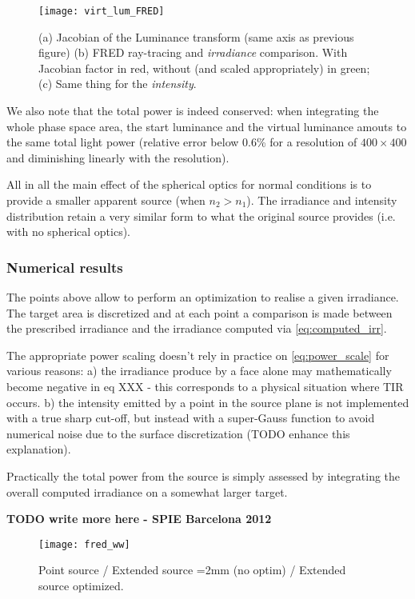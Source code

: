 \begin{figure}[!htbp]
\centering
\texttt{[image: virt\_lum\_FRED]} 
\caption{(a) Jacobian of the Luminance transform (same axis as previous figure)
(b) FRED ray-tracing and \textit{irradiance} comparison. 
 With Jacobian factor in red, without (and scaled appropriately) in green; 
 (c) Same thing for the \textit{intensity}. }
\label{fig:virt_lum_fred}
\end{figure}

We also note that the total power is indeed conserved: when integrating the whole phase
space area, the start luminance and the virtual luminance amouts to the same total
light power (relative error below 0.6\% for a resolution of $400\times 400$ and diminishing
linearly with the resolution).

All in all the main effect of the spherical optics for normal conditions is to provide
a smaller apparent source (when $n_2 > n_1$). The irradiance and 
intensity distribution retain a very similar form
to what the original source provides (i.e. with no spherical optics).

\subsubsection*{Numerical results}
The points above allow to perform an optimization to realise a given irradiance.
The target area is discretized and at each point a comparison is made between 
the prescribed irradiance and the irradiance computed via \eqref{eq:computed_irr}.

The appropriate power scaling doesn't rely in practice on \eqref{eq:power_scale}
for various reasons: a) the irradiance produce by a face alone may mathematically
become negative in eq XXX - this corresponds to a physical situation where
TIR occurs. 
b) the intensity emitted by a point in the source plane is not implemented with
a true sharp cut-off, but instead with a super-Gauss function to avoid numerical
noise due to the surface discretization (TODO enhance this explanation).

Practically the total power from the source is simply assessed by integrating the overall
computed irradiance on a somewhat larger target.

\textbf{TODO write more here - SPIE Barcelona 2012}

\begin{figure}[!htbp]
\centering
\texttt{[image: fred\_ww]} 
\caption{Point source / Extended source =2mm (no optim) / Extended source optimized. }
\label{fig:res_fred_ww}
\end{figure}

